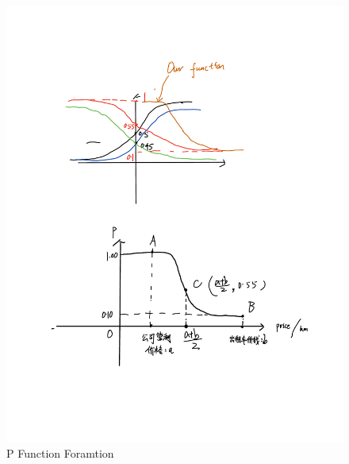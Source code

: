 \documentclass{llncs}
\begin{document}
\begin{figure}[h]
	
	\centering
	\includegraphics[width=12cm]{figures/Pfunction.pdf}
	\caption{P Function Foramtion}
	\label{fig-p}
	
\end{figure}
\end{document}

